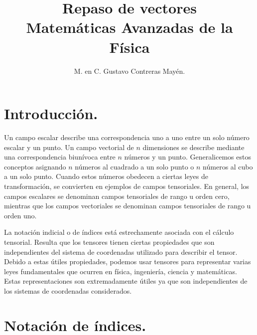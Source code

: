 
\usetikzlibrary{babel}
\setlength{\tabcolsep}{12pt}
\title{Repaso de vectores \\ \large{Matemáticas Avanzadas de la Física}\vspace{-3ex}}
\author{M. en C. Gustavo Contreras Mayén.}
\date{ }

\vspace{-4cm}
\maketitle
\fontsize{14}{14}\selectfont
\section{Introducción.}
Un campo escalar describe una correspondencia uno a uno entre un solo número escalar y un punto. Un campo vectorial de $n$ dimensiones se describe mediante una correspondencia biunívoca entre $n$ números y un punto. Generalicemos estos conceptos asignando $n$ números al cuadrado a un solo punto o $n$ números al cubo a un solo punto. Cuando estos números obedecen a ciertas leyes de transformación, se convierten en ejemplos de campos tensoriales. En general, los campos escalares se denominan campos tensoriales de rango u orden cero, mientras que los campos vectoriales se denominan campos tensoriales de rango u orden uno.
\par
La notación indicial o de índices está estrechamente asociada con el cálculo tensorial. Resulta que los tensores tienen ciertas propiedades que son independientes del sistema de coordenadas utilizado para describir el tensor. Debido a estas útiles propiedades, podemos usar tensores para representar varias leyes fundamentales que ocurren en física, ingeniería, ciencia y matemáticas. Estas representaciones son extremadamente útiles ya que son independientes de los sistemas de coordenadas considerados.

\section{Notación de índices.}


